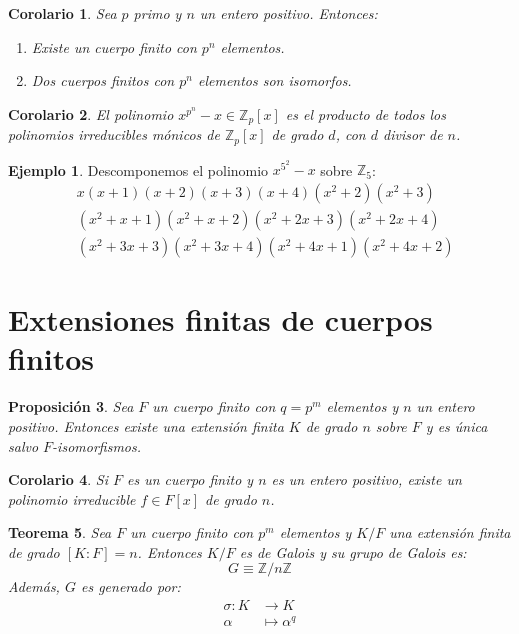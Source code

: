 \documentclass{report}
\newtheorem{theorem}{Teorema}[chapter]
\newtheorem{corollary}[theorem]{Corolario}
\newtheorem{proposition}[theorem]{Proposición}
\theoremstyle{remark}
\theoremstyle{definition}
\theoremstyle{definition}
\theoremstyle{definition}
\newtheorem*{example}{Ejemplo}
\begin{document}
\begin{corollary}
    Sea $p$ primo y $n$ un entero positivo. Entonces:
    \begin{enumerate}
        \item Existe un cuerpo finito con $p^n$ elementos.
        \item Dos cuerpos finitos con $p^n$ elementos son isomorfos.
    \end{enumerate}
\end{corollary}

\begin{corollary}
    El polinomio $x^{p^n}-x \in \mathbb{Z}_p[x]$ es el producto de todos los polinomios irreducibles mónicos de $\mathbb{Z}_p[x]$ de grado $d$, con $d$ divisor de $n$.
\end{corollary}

\begin{example}
    Descomponemos el polinomio $x^{5^2} - x$ sobre $\mathbb{Z}_5$:
    \begin{align*}
         & x(x+1)(x+2)(x+3)(x+4)(x^2+2)(x^2+3)      \\
         & (x^2+x+1)(x^2+x+2)(x^2+2x+3)(x^2+2x+4)   \\
         & (x^2+3x+3)(x^2+3x+4)(x^2+4x+1)(x^2+4x+2)
    \end{align*}
\end{example}

\section{Extensiones finitas de cuerpos finitos}

\begin{proposition}
    Sea $F$ un cuerpo finito con $q = p^m$ elementos y $n$ un entero positivo.
    Entonces existe una extensión finita $K$ de grado $n$ sobre $F$ y es única salvo $F$-isomorfismos.
\end{proposition}

\begin{corollary}
    Si $F$ es un cuerpo finito y $n$ es un entero positivo, existe un polinomio irreducible $f \in F[x]$ de grado $n$.
\end{corollary}

\begin{theorem}
    Sea $F$ un cuerpo finito con $p^m$ elementos y $K/F$ una extensión finita de grado $[K : F] = n$.
    Entonces $K/F$ es de Galois y su grupo de Galois es:
    $$G \equiv \mathbb{Z}/n\mathbb{Z}$$
    Además, $G$ es generado por:
    \begin{align*}
        \sigma : K & \to K            \\
        \alpha     & \mapsto \alpha^q
    \end{align*}
\end{theorem}
\end{document}
